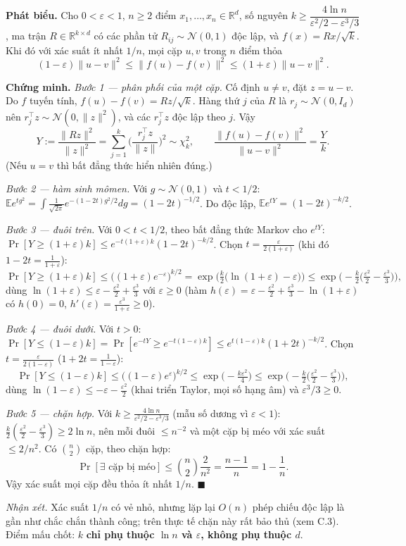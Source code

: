 \textbf{Phát biểu.} Cho \(0<\varepsilon<1\), \(n\ge2\) điểm \(x_1,\dots,x_n\in\mathbb R^d\), số nguyên \(k\ge\dfrac{4\ln n}{\varepsilon^2/2-\varepsilon^3/3}\), ma trận \(R\in\mathbb R^{k\times d}\) có các phần tử \(R_{ij}\sim\mathcal N(0,1)\) độc lập, và \(f(x)=Rx/\sqrt k\). Khi đó với xác suất ít nhất \(1/n\), mọi cặp \(u,v\) trong \(n\) điểm thỏa \[(1-\varepsilon)\|u-v\|^2\le\|f(u)-f(v)\|^2\le(1+\varepsilon)\|u-v\|^2 .\]

\textbf{Chứng minh.} \emph{Bước 1 --- phân phối của một cặp.} Cố định \(u\ne v\), đặt \(z=u-v\). Do \(f\) tuyến tính, \(f(u)-f(v)=Rz/\sqrt k\). Hàng thứ \(j\) của \(R\) là \(r_j\sim\mathcal N(0,I_d)\) nên \(r_j^\top z\sim\mathcal N(0,\|z\|^2)\), và các \(r_j^\top z\) độc lập theo \(j\). Vậy \[Y:=\frac{\|Rz\|^2}{\|z\|^2}=\sum_{j=1}^k\Big(\frac{r_j^\top z}{\|z\|}\Big)^2\sim\chi^2_k,\qquad \frac{\|f(u)-f(v)\|^2}{\|u-v\|^2}=\frac Yk .\] (Nếu \(u=v\) thì bất đẳng thức hiển nhiên đúng.)

\emph{Bước 2 --- hàm sinh mômen.} Với \(g\sim\mathcal N(0,1)\) và \(t<1/2\): \(\mathbb E e^{tg^2}=\int\frac{1}{\sqrt{2\pi}}e^{-(1-2t)g^2/2}dg=(1-2t)^{-1/2}\). Do độc lập, \(\mathbb Ee^{tY}=(1-2t)^{-k/2}\).

\emph{Bước 3 --- đuôi trên.} Với \(0<t<1/2\), theo bất đẳng thức Markov cho \(e^{tY}\): \(\Pr[Y\ge(1+\varepsilon)k]\le e^{-t(1+\varepsilon)k}(1-2t)^{-k/2}\). Chọn \(t=\frac{\varepsilon}{2(1+\varepsilon)}\) (khi đó \(1-2t=\frac1{1+\varepsilon}\)): \[\Pr[Y\ge(1+\varepsilon)k]\le\big((1+\varepsilon)e^{-\varepsilon}\big)^{k/2}=\exp\Big(\tfrac k2\big(\ln(1+\varepsilon)-\varepsilon\big)\Big)\le\exp\Big(-\tfrac k2\big(\tfrac{\varepsilon^2}2-\tfrac{\varepsilon^3}3\big)\Big),\] dùng \(\ln(1+\varepsilon)\le\varepsilon-\frac{\varepsilon^2}2+\frac{\varepsilon^3}3\) với \(\varepsilon\ge0\) (hàm \(h(\varepsilon)=\varepsilon-\frac{\varepsilon^2}2+\frac{\varepsilon^3}3-\ln(1+\varepsilon)\) có \(h(0)=0\), \(h'(\varepsilon)=\frac{\varepsilon^3}{1+\varepsilon}\ge0\)).

\emph{Bước 4 --- đuôi dưới.} Với \(t>0\): \(\Pr[Y\le(1-\varepsilon)k]=\Pr[e^{-tY}\ge e^{-t(1-\varepsilon)k}]\le e^{t(1-\varepsilon)k}(1+2t)^{-k/2}\). Chọn \(t=\frac{\varepsilon}{2(1-\varepsilon)}\) (\(1+2t=\frac1{1-\varepsilon}\)): \[\Pr[Y\le(1-\varepsilon)k]\le\big((1-\varepsilon)e^{\varepsilon}\big)^{k/2}\le\exp\Big(-\tfrac{k\varepsilon^2}4\Big)\le\exp\Big(-\tfrac k2\big(\tfrac{\varepsilon^2}2-\tfrac{\varepsilon^3}3\big)\Big),\] dùng \(\ln(1-\varepsilon)\le-\varepsilon-\frac{\varepsilon^2}2\) (khai triển Taylor, mọi số hạng âm) và \(\varepsilon^3/3\ge0\).

\emph{Bước 5 --- chặn hợp.} Với \(k\ge\frac{4\ln n}{\varepsilon^2/2-\varepsilon^3/3}\) (mẫu số dương vì \(\varepsilon<1\)): \(\frac k2(\frac{\varepsilon^2}2-\frac{\varepsilon^3}3)\ge2\ln n\), nên mỗi đuôi \(\le n^{-2}\) và một cặp bị méo với xác suất \(\le 2/n^2\). Có \(\binom n2\) cặp, theo chặn hợp: \[\Pr[\exists\text{ cặp bị méo}]\le\binom n2\frac2{n^2}=\frac{n-1}n=1-\frac1n .\] Vậy xác suất mọi cặp đều thỏa ít nhất \(1/n\). \(\blacksquare\)

\emph{Nhận xét.} Xác suất \(1/n\) có vẻ nhỏ, nhưng lặp lại \(O(n)\) phép chiếu độc lập là gần như chắc chắn thành công; trên thực tế chặn này rất bảo thủ (xem C.3). Điểm mấu chốt: \(k\) \textbf{chỉ phụ thuộc \(\ln n\) và \(\varepsilon\), không phụ thuộc \(d\)}.

